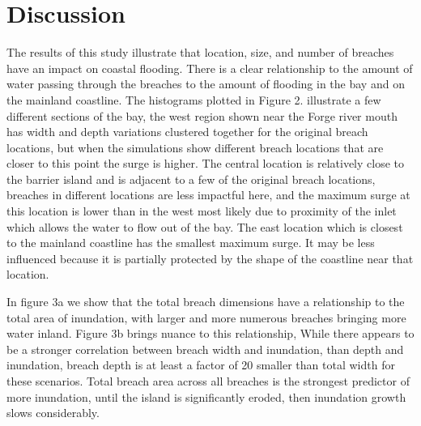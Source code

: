 \documentclass{coastal_paper}
\begin{document}
\section{Discussion}
The results of this study illustrate that location, size, and number of breaches have an impact on coastal flooding. There is a clear relationship to the amount of water passing through the breaches to the amount of flooding in the bay and on the mainland coastline. The histograms plotted in Figure 2. illustrate a few different sections of the bay, the west region shown near the Forge river mouth has width and depth variations clustered together for the original breach locations, but when the simulations show different breach locations that are closer to this point the surge is higher. The central location is relatively close to the barrier island and is adjacent to a few of the original breach locations, breaches in different locations are less impactful here, and the maximum surge at this location is lower than in the west most likely due to proximity of the inlet which allows the water to flow out of the bay. The east location which is closest to the mainland coastline has the smallest maximum surge. It may be less influenced because it is partially protected by the shape of the coastline near that location.

In figure 3a we show that the total breach dimensions have a relationship to the total area of inundation, with larger and more numerous breaches bringing more water inland. Figure 3b brings nuance to this relationship, While there appears to be a stronger correlation between breach width and inundation, than depth and inundation, breach depth is at least a factor of 20 smaller than total width for these scenarios. Total breach area across all breaches is the strongest predictor of more inundation, until the island is significantly eroded, then inundation growth slows considerably.
\end{document}
